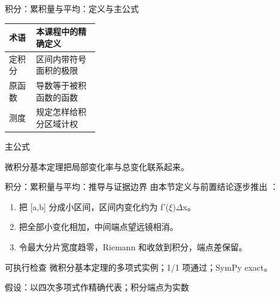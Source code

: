\begin{frame}[t]{积分：累积量与平均：定义与主公式}
\footnotesize\begin{tabularx}{\linewidth}{p{0.30\linewidth}Y}
\toprule 术语 & 本课程中的精确定义\\\midrule
{} 定积分 & 区间内带符号面积的极限\\
 原函数 & 导数等于被积函数的函数\\
 测度 & 规定怎样给积分区域计权\\
\bottomrule\end{tabularx}\vspace{0.15cm}
\begin{block}{ 主公式}\centering{}\end{block}
微积分基本定理把局部变化率与总变化联系起来。
\end{frame}

\begin{frame}[t]{积分：累积量与平均：推导与证据边界}
\footnotesize
{}\quad 由本节定义与前置结论逐步推出 ：
\begin{enumerate}
\item 把 [a,b] 分成小区间，区间内变化约为 f'(\ensuremath{\xi})\ensuremath{\Delta}x。
\item 把全部小变化相加，中间端点望远镜相消。
\item 令最大分片宽度趋零，Riemann 和收敛到积分，端点差保留。
\end{enumerate}\begin{block}{可执行检查}
\quad 微积分基本定理的多项式实例；1/1 项通过；SymPy exact。
\par\scriptsize 假设：以四次多项式作精确代表；积分端点为实数
\end{block}
\end{frame}

